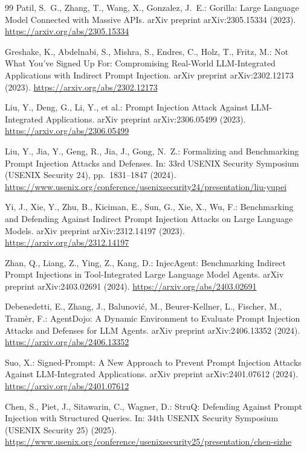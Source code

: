 \documentclass[runningheads]{llncs}
\begin{document}
\begin{thebibliography}{99}
Patil, S.~G., Zhang, T., Wang, X., Gonzalez, J.~E.: Gorilla: Large Language Model Connected with Massive APIs. arXiv preprint arXiv:2305.15334 (2023). \url{https://arxiv.org/abs/2305.15334}

Greshake, K., Abdelnabi, S., Mishra, S., Endres, C., Holz, T., Fritz, M.: Not What You've Signed Up For: Compromising Real-World LLM-Integrated Applications with Indirect Prompt Injection. arXiv preprint arXiv:2302.12173 (2023). \url{https://arxiv.org/abs/2302.12173}

Liu, Y., Deng, G., Li, Y., et al.: Prompt Injection Attack Against LLM-Integrated Applications. arXiv preprint arXiv:2306.05499 (2023). \url{https://arxiv.org/abs/2306.05499}

Liu, Y., Jia, Y., Geng, R., Jia, J., Gong, N.~Z.: Formalizing and Benchmarking Prompt Injection Attacks and Defenses. In: 33rd USENIX Security Symposium (USENIX Security 24), pp.~1831--1847 (2024). \url{https://www.usenix.org/conference/usenixsecurity24/presentation/liu-yupei}

Yi, J., Xie, Y., Zhu, B., Kiciman, E., Sun, G., Xie, X., Wu, F.: Benchmarking and Defending Against Indirect Prompt Injection Attacks on Large Language Models. arXiv preprint arXiv:2312.14197 (2023). \url{https://arxiv.org/abs/2312.14197}

Zhan, Q., Liang, Z., Ying, Z., Kang, D.: InjecAgent: Benchmarking Indirect Prompt Injections in Tool-Integrated Large Language Model Agents. arXiv preprint arXiv:2403.02691 (2024). \url{https://arxiv.org/abs/2403.02691}

Debenedetti, E., Zhang, J., Balunovi\'c, M., Beurer-Kellner, L., Fischer, M., Tram\`er, F.: AgentDojo: A Dynamic Environment to Evaluate Prompt Injection Attacks and Defenses for LLM Agents. arXiv preprint arXiv:2406.13352 (2024). \url{https://arxiv.org/abs/2406.13352}

Suo, X.: Signed-Prompt: A New Approach to Prevent Prompt Injection Attacks Against LLM-Integrated Applications. arXiv preprint arXiv:2401.07612 (2024). \url{https://arxiv.org/abs/2401.07612}

Chen, S., Piet, J., Sitawarin, C., Wagner, D.: StruQ: Defending Against Prompt Injection with Structured Queries. In: 34th USENIX Security Symposium (USENIX Security 25) (2025). \url{https://www.usenix.org/conference/usenixsecurity25/presentation/chen-sizhe}


\end{thebibliography}
\end{document}
